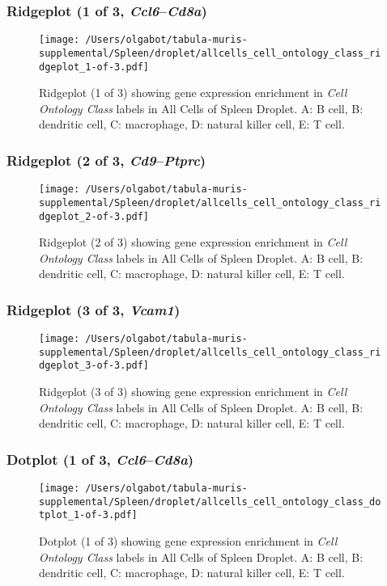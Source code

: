 \subsubsection{Ridgeplot (1 of 3, \emph{Ccl6}--\emph{Cd8a})}
\begin{figure}[h]
\centering
\texttt{[image: /Users/olgabot/tabula-muris-supplemental/Spleen/droplet/allcells\_cell\_ontology\_class\_ridgeplot\_1-of-3.pdf]}

\caption{ Ridgeplot (1 of 3)  showing gene expression enrichment in \emph{Cell Ontology Class} labels in All Cells of Spleen Droplet. A: B cell, B: dendritic cell, C: macrophage, D: natural killer cell, E: T cell.}
\end{figure}


\clearpage

\subsubsection{Ridgeplot (2 of 3, \emph{Cd9}--\emph{Ptprc})}
\begin{figure}[h]
\centering
\texttt{[image: /Users/olgabot/tabula-muris-supplemental/Spleen/droplet/allcells\_cell\_ontology\_class\_ridgeplot\_2-of-3.pdf]}

\caption{ Ridgeplot (2 of 3)  showing gene expression enrichment in \emph{Cell Ontology Class} labels in All Cells of Spleen Droplet. A: B cell, B: dendritic cell, C: macrophage, D: natural killer cell, E: T cell.}
\end{figure}


\clearpage

\subsubsection{Ridgeplot (3 of 3, \emph{Vcam1})}
\begin{figure}[h]
\centering
\texttt{[image: /Users/olgabot/tabula-muris-supplemental/Spleen/droplet/allcells\_cell\_ontology\_class\_ridgeplot\_3-of-3.pdf]}

\caption{ Ridgeplot (3 of 3)  showing gene expression enrichment in \emph{Cell Ontology Class} labels in All Cells of Spleen Droplet. A: B cell, B: dendritic cell, C: macrophage, D: natural killer cell, E: T cell.}
\end{figure}


\clearpage

\subsubsection{Dotplot (1 of 3, \emph{Ccl6}--\emph{Cd8a})}
\begin{figure}[h]
\centering
\texttt{[image: /Users/olgabot/tabula-muris-supplemental/Spleen/droplet/allcells\_cell\_ontology\_class\_dotplot\_1-of-3.pdf]}

\caption{ Dotplot (1 of 3)  showing gene expression enrichment in \emph{Cell Ontology Class} labels in All Cells of Spleen Droplet. A: B cell, B: dendritic cell, C: macrophage, D: natural killer cell, E: T cell.}
\end{figure}


